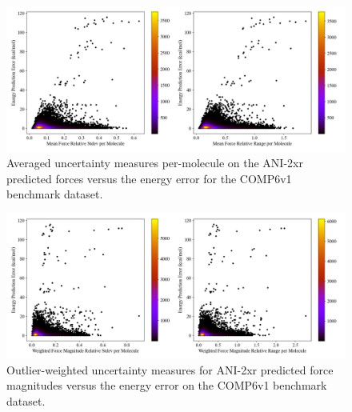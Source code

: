 \begin{figure}[!hp]
    \centering
    \includegraphics[width=1\linewidth]{Images/2xr_forces/2xr_comp6v1_force-mean-uncertainty-vs-energy.png}
    \caption[Average force uncertainty measures per-molecule versus energy error (COMP6v1)]{Averaged uncertainty measures per-molecule on the ANI-2xr predicted forces versus the energy error for the COMP6v1 benchmark dataset.}
    \label{fig:2xr_comp6v1-mean_force_uncertainty_hexbin}
\end{figure}

\begin{figure}[!hp]
    \centering
    \includegraphics[width=1\linewidth]{Images/2xr_forces/2xr_comp6v1_force-weighted-uncertainty-vs-energy.png}
    \caption[Force uncertainty weighted by outliers versus energy error (COMP6v1)]{Outlier-weighted uncertainty measures for ANI-2xr predicted force magnitudes versus the energy error on the COMP6v1 benchmark dataset.}
    \label{fig:2xr_comp6v1-forces-weighed_uncertainty}
\end{figure}

